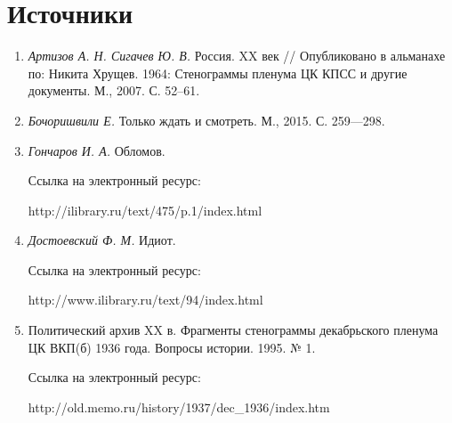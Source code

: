 
    \section*{Источники}
      \begin{enumerate}
        \item \textit{Артизов А. Н. Сигачев Ю. В.} Россия. XX век // Опубликовано в альманахе по: Никита Хрущев. 1964: Стенограммы пленума ЦК КПСС и другие документы. М., 2007. С. 52–61.
        \item \textit{Бочоришвили Е.} Только ждать и смотреть. М., 2015. С. 259---298.
        \item \textit{Гончаров И. А.} Обломов. \par Ссылка на электронный ресурс: \par http://ilibrary.ru/text/475/p.1/index.html
        \item \textit{Достоевский Ф. М.} Идиот. \par Ссылка на электронный ресурс: 
        \par http://www.ilibrary.ru/text/94/index.html
        \item Политический архив XX в. Фрагменты стенограммы декабрьского пленума ЦК ВКП(б) 1936 года. Вопросы истории. 1995. № 1. \par Ссылка на электронный ресурс:
        \par http://old.memo.ru/history/1937/dec\_1936/index.htm
      \end{enumerate}
      
